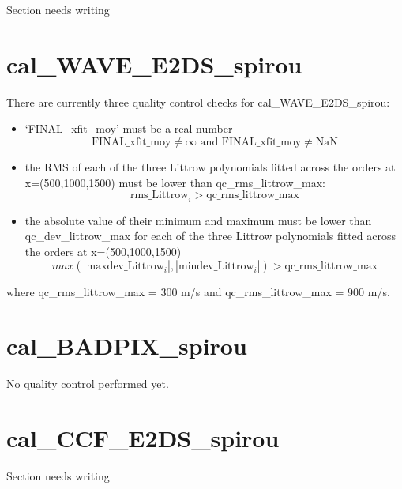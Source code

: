 Section needs writing

\section{cal\_WAVE\_E2DS\_spirou}
\label{section:qc_cal_WAVE_E2DS_spirou}

There are currently three quality control checks for cal\_WAVE\_E2DS\_spirou:

\begin{itemize}
\item `FINAL\_xfit\_moy' must be a real number
	\begin{equation}
	\text{FINAL\_xfit\_moy} \neq \infty \text{ and }
	\text{FINAL\_xfit\_moy} \neq \text{NaN}
	\end{equation}
\item the RMS of each of the three Littrow polynomials fitted across the orders at x=(500,1000,1500) must be lower than qc\_rms\_littrow\_max: 
	\begin{equation}
	\text{rms\_Littrow}_i > \text{qc\_rms\_littrow\_max}
	\end{equation}
\item the absolute value of their minimum and maximum must be lower than qc\_dev\_littrow\_max for each of the three Littrow polynomials fitted across the orders at x=(500,1000,1500)
	\begin{equation}
	max(|\text{maxdev\_Littrow}_i|, |\text{mindev\_Littrow}_i|) > \text{qc\_rms\_littrow\_max}
	\end{equation}
\end{itemize}

\noindent where qc\_rms\_littrow\_max = 300 m/s and qc\_rms\_littrow\_max = 900 m/s.


\section{cal\_BADPIX\_spirou}
\label{section:qc_cal_BADPIX_spirou}

No quality control performed yet.

\section{cal\_CCF\_E2DS\_spirou}
\label{section:qc_cal_CCF_E2DS_spirou}

Section needs writing


